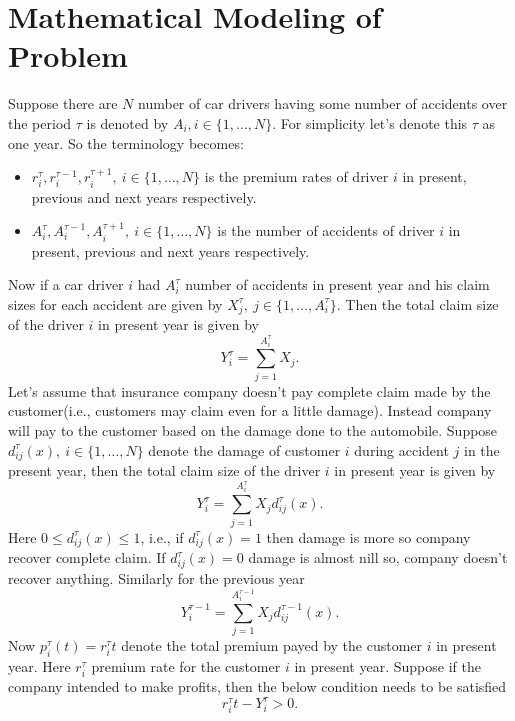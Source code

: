 \documentclass[a4paper,english,12pt]{article}
\begin{document}
\section{Mathematical Modeling of Problem}
Suppose there are $N$ number of car drivers having some number of accidents over the period $\tau$ is denoted by $A_i, i\in\{1,\dots,N\}$. For simplicity let's denote this $\tau$ as one year. So the terminology becomes:
\begin{itemize}
\item $r_i^\tau, r_i^{\tau-1}, r_i^{\tau+1},\  i\in\{1,\dots,N\}$ is the premium rates of driver $i$ in present, previous and next years respectively.
\item $A_i^\tau, A_i^{\tau-1}, A_i^{\tau+1},\  i\in\{1,\dots,N\}$ is the number of accidents of driver $i$ in present, previous and next years respectively.
\end{itemize}
Now if a car driver $i$ had $A_i^\tau$ number of accidents in present year and his claim sizes for each accident are given by $X_j^\tau, \ j\in\{1,\dots,A_i^\tau\}$. Then the total claim size of the driver $i$ in present year is given by
\begin{equation}
Y_i^\tau=\sum_{j=1}^{A_i^\tau}X_j.
\end{equation}
Let's assume that insurance company doesn't pay complete claim made by the customer(i.e., customers may claim even for a little damage). Instead company will pay to the customer based on the damage done to the automobile. Suppose $d_{ij}^\tau(x),\ i\in\{1,\dots,N\} $ denote the damage of customer $i$ during accident $j$ in the present year, then the total claim size of the driver $i$ in present year is given by
\begin{equation}
Y_i^\tau=\sum_{j=1}^{A_i^\tau}X_jd_{ij}^\tau(x).
\end{equation}
Here $0\leq d_{ij}^\tau(x)\leq 1$, i.e., if $d_{ij}^\tau(x)=1$ then damage is more so company recover complete claim. If $d_{ij}^\tau(x)=0$ damage is almost nill so, company doesn't recover anything. Similarly for the previous year
\begin{equation}
Y_i^{\tau-1}=\sum_{j=1}^{A_i^{\tau-1}}X_jd_{ij}^{\tau-1}(x).
\end{equation}
Now $p_i^\tau(t)=r_i^\tau t$ denote the total premium payed by the customer $i$ in present year. Here $r_i^\tau$ premium rate for the customer $i$ in present year. Suppose if the company intended to make profits, then the below condition needs to be satisfied
\begin{equation}
r_i^\tau t-Y_i^{\tau}>0.
\end{equation}
\end{document}
